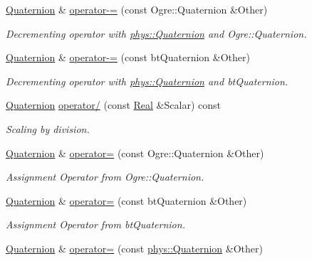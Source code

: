\begin{DoxyCompactItemize}
\hyperlink{classphys_1_1Quaternion}{Quaternion} \& \hyperlink{classphys_1_1Quaternion_af62037687eea0005c9fc4a09355656ed}{operator-\/=} (const Ogre::Quaternion \&Other)
\begin{DoxyCompactList}\small\item\em Decrementing operator with \hyperlink{classphys_1_1Quaternion}{phys::Quaternion} and Ogre::Quaternion. \item\end{DoxyCompactList}\item 
\hyperlink{classphys_1_1Quaternion}{Quaternion} \& \hyperlink{classphys_1_1Quaternion_abd1e9d740b3af194c60466105d07f6ff}{operator-\/=} (const btQuaternion \&Other)
\begin{DoxyCompactList}\small\item\em Decrementing operator with \hyperlink{classphys_1_1Quaternion}{phys::Quaternion} and btQuaternion. \item\end{DoxyCompactList}\item 
\hyperlink{classphys_1_1Quaternion}{Quaternion} \hyperlink{classphys_1_1Quaternion_a9b9492e5a14178aedc784e93b0153364}{operator/} (const \hyperlink{namespacephys_af7eb897198d265b8e868f45240230d5f}{Real} \&Scalar) const 
\begin{DoxyCompactList}\small\item\em Scaling by division. \item\end{DoxyCompactList}\item 
\hyperlink{classphys_1_1Quaternion}{Quaternion} \& \hyperlink{classphys_1_1Quaternion_a6b9fe92548e3fd114d7419ddd5d5a660}{operator=} (const Ogre::Quaternion \&Other)
\begin{DoxyCompactList}\small\item\em Assignment Operator from Ogre::Quaternion. \item\end{DoxyCompactList}\item 
\hyperlink{classphys_1_1Quaternion}{Quaternion} \& \hyperlink{classphys_1_1Quaternion_a05e7364791bf7f38ad63dc59184cd5ca}{operator=} (const btQuaternion \&Other)
\begin{DoxyCompactList}\small\item\em Assignment Operator from btQuaternion. \item\end{DoxyCompactList}\item 
\hyperlink{classphys_1_1Quaternion}{Quaternion} \& \hyperlink{classphys_1_1Quaternion_a6213bddf8f928a8510260b9deb712fd7}{operator=} (const \hyperlink{classphys_1_1Quaternion}{phys::Quaternion} \&Other)

\end{DoxyCompactItemize}
